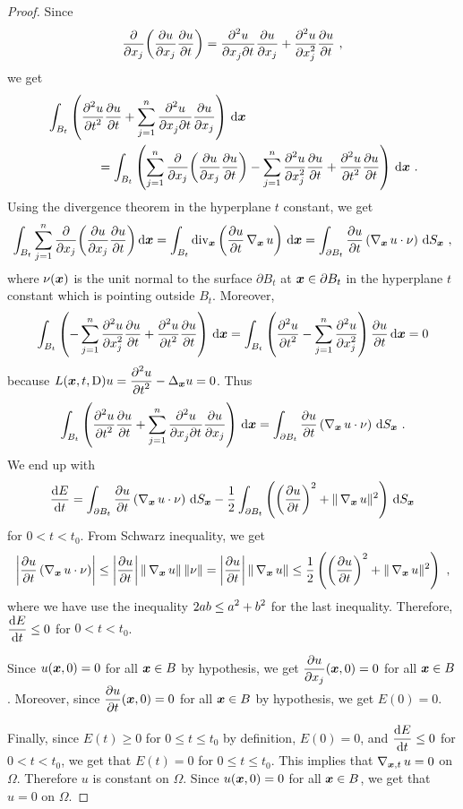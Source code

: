 \begin{proof}
Since
\[
\pdfdx{ \left( \pdydx{u}{x_j} \pdydx{u}{t} \right) }{x_j}
= \pdydxnm{u}{x_j}{t}{2}{}{} \pdydx{u}{x_j} + \pdydxn{u}{x_j}{2}
\pdydx{u}{t} \ ,
\]
we get
\begin{align*}
&\int_{B_t} \left( \pdydxn{u}{t}{2} \pdydx{u}{t} +
\sum_{j=1}^n \pdydxnm{u}{x_j}{t}{2}{}{} \pdydx{u}{x_j} \right)
\dx{\VEC{x}} \\
&\qquad \qquad = \int_{B_t} \left( \sum_{j=1}^n
\pdfdx{ \left( \pdydx{u}{x_j} \pdydx{u}{t} \right) }{x_j}
- \sum_{j=1}^n \pdydxn{u}{x_j}{2} \pdydx{u}{t} + 
\pdydxn{u}{t}{2} \pdydx{u}{t} \right) \dx{\VEC{x}} \ .
\end{align*}
Using the divergence theorem in the hyperplane $t$ constant, we get
\[
\int_{B_t} \sum_{j=1}^n
\pdfdx{ \left( \pdydx{u}{x_j} \pdydx{u}{t} \right) }{x_j} \dx{\VEC{x}}
= \int_{B_t} \diV_\VEC{x} \left( \pdydx{u}{t} \graD_{\VEC{x}} u \right)
\dx{\VEC{x}}
= \int_{\partial B_t} \pdydx{u}{t} \left( \graD_{\VEC{x}} u \cdot
\nu \right) \dss{S}{x} \  ,
\]
where $\nu(\VEC{x})$ is the unit normal to the surface
$\partial B_t$ at $\VEC{x} \in \partial B_t$ in the hyperplane $t$
constant which is pointing outside $B_t$.
Moreover,
\[
\int_{B_t} \left( - \sum_{j=1}^n \pdydxn{u}{x_j}{2} \pdydx{u}{t} + 
\pdydxn{u}{t}{2} \pdydx{u}{t} \right) \dx{\VEC{x}} =
\int_{B_t} \left( \pdydxn{u}{t}{2} -
\sum_{j=1}^n \pdydxn{u}{x_j}{2} \right) \pdydx{u}{t} \dx{\VEC{x}} = 0
\]
because
$\DS L(\VEC{x},t,\diff) u = \pdydxn{u}{t}{2} -
\Delta_{\VEC{x}} u = 0$.
Thus
\[
\int_{B_t} \left( \pdydxn{u}{t}{2} \pdydx{u}{t} +
\sum_{j=1}^n \pdydxnm{u}{x_j}{t}{2}{}{} \pdydx{u}{x_j} \right)
\dx{\VEC{x}} =
\int_{\partial B_t} \pdydx{u}{t} \left( \graD_{\VEC{x}} u \cdot
\nu \right) \dss{S}{x} \ .
\]
We end up with
\[
\dydx{E}{t} = \int_{\partial B_t} \pdydx{u}{t} \left( \graD_{\VEC{x}} u \cdot
\nu \right) \dss{S}{x}
- \frac{1}{2} \int_{\partial B_t} \left( \left(\pdydx{u}{t}\right)^2 
+ \|\graD_{\VEC{x}} u \|^2 \right)\dss{S}{x}
\]
for $0 <t < t_0$.  From Schwarz inequality, we get
\[
\left| \pdydx{u}{t} \left(\graD_{\VEC{x}} u \cdot \nu \right) \right|
 \leq \left| \pdydx{u}{t} \right| \| \graD_{\VEC{x}} u \|\,\|\nu\|
= \left| \pdydx{u}{t} \right| \| \graD_{\VEC{x}} u \|
\leq \frac{1}{2} \left( \left(\pdydx{u}{t}\right)^2 +
\|\graD_{\VEC{x}} u \|^2 \right) \ ,
\]
where we have use the inequality $\DS 2ab \leq a^2 + b^2$ for the last
inequality.  Therefore,
$\DS \dydx{E}{t} \leq 0$ for $0 <t < t_0$.

Since $u(\VEC{x},0)=0$ for all $\VEC{x} \in B$ by hypothesis, we get
$\DS \pdydx{u}{x_j}(\VEC{x},0) = 0$ for all $\VEC{x} \in B$.
Moreover, since $\DS \pdydx{u}{t}(\VEC{x},0)=0$ for all
$\VEC{x} \in B$ by hypothesis, we get $E(0)=0$.

Finally, since $E(t) \geq 0$ for $0 \leq t \leq t_0$ by definition,
$E(0) = 0$, and $\DS \dydx{E}{t} \leq 0$ for $0 <t < t_0$,
we get that $E(t) = 0$ for $0 \leq t \leq t_0$.  This implies that
$\graD_{\VEC{x},t} u = 0$ on $\Omega$.  Therefore $u$ is constant on
$\Omega$.  Since $u(\VEC{x},0)=0$ for all $\VEC{x} \in B$, we get that
$u=0$ on $\Omega$.
\end{proof}

